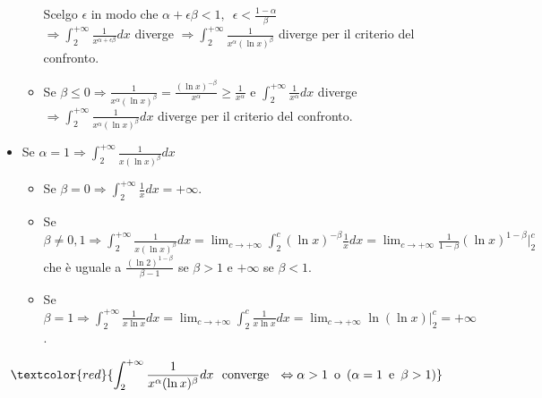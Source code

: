 \documentclass{article}
\begin{document}
\begin{itemize}
\begin{itemize}
        Scelgo  $\epsilon$ in modo che $ \alpha+\epsilon\beta < 1,\,\,\, \epsilon < \frac{1-\alpha}{\beta} $\\
        $\Rightarrow \int_{2}^{+\infty} \frac{1}{x^{\alpha+\epsilon\beta}}dx$ diverge $\Rightarrow \int_{2}^{+\infty} \frac{1}{x^\alpha(\ln x)^\beta}$ diverge per il criterio del confronto.
        \item  Se $\beta \leq 0 \Rightarrow \frac{1}{x^\alpha(\ln x)^\beta} = \frac{(\ln x)^{-\beta}}{x^\alpha} \geq \frac{1}{x^\alpha}$ e $\int_{2}^{+\infty}\frac{1}{x^\alpha}dx$ diverge $\Rightarrow \int_{2}^{+\infty} \frac{1}{x^\alpha (\ln x)^\beta}dx$ diverge per il criterio del confronto.
    \end{itemize}
    \item Se $\alpha=1 \Rightarrow \int_{2}^{+\infty} \frac{1}{x(\ln x)^\beta} dx$
    \begin{itemize}
        \item Se $\beta=0 \Rightarrow \int_{2}^{+\infty} \frac{1}{x}dx =+\infty$.
        \item Se $\beta \neq 0,1 \Rightarrow \int_{2}^{+\infty} \frac{1}{x(\ln x)^\beta}dx=\lim_{c \rightarrow +\infty} \int_{2}^{c}(\ln x)^{-\beta}\frac{1}{x} dx = \lim_{c \rightarrow +\infty} \frac{1}{1-\beta}(\ln x)^{1-\beta}|_{2}^{c}$ che è uguale a $\frac{(\ln 2)^{1-\beta}}{\beta -1}$ se $\beta >1$ e $+\infty$ se $\beta < 1$.
        \item Se $\beta = 1 \Rightarrow \int_{2}^{+\infty} \frac{1}{x \ln x}dx = \lim_{c \rightarrow +\infty}\int_{2}^{c} \frac{1}{x \ln x}dx = \lim_{c\rightarrow +\infty} \ln(\ln x)|_{2}^{c}=+\infty$.
    \end{itemize}
\end{itemize}
\begin{equation*}
    \textcolor{red}{
    \int_{2}^{+\infty} \frac{1}{x^\alpha(\ln x)^\beta}dx
    \,\,\,\, \text{converge} \,\,\,\,
    \Leftrightarrow \alpha > 1 \,\,\, \text{o} \,\,\, (\alpha=1 \,\,\, \text{e}\,\,\, \beta >1)}
\end{equation*}
\end{document}

